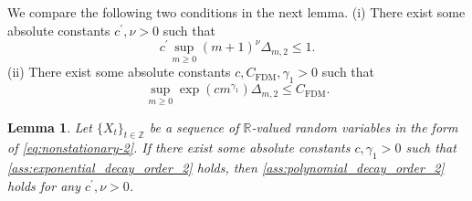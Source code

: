 \documentclass[11pt]{article}
\theoremstyle{plain}
\newtheorem{lemma}[theorem]{Lemma}
\theoremstyle{definition}
\begin{document}
We compare the following two conditions in the next lemma. (i) There exist some absolute constants $c^{\prime}, \nu > 0$ such that
    \begin{equation}\label{ass:polynomial_decay_order_2}
        c^{\prime}\sup_{m \geq 0}(m+1)^{\nu}\Delta_{m,2} \leq 1.
    \end{equation}
    (ii) There exist some absolute constants $c,  C_{\mathrm{FDM}}, \gamma_1 > 0$ such that
    \begin{equation}\label{ass:exponential_decay_order_2}
        \sup_{m \geq 0}\exp(cm^{\gamma_1})\Delta_{m,2} \leq C_{\mathrm{FDM}}.
    \end{equation}
    
\begin{lemma}
    Let $\{X_t\}_{t \in \mathbb{Z}}$ be a sequence of $\mathbb{R}$-valued random variables in the form of \eqref{eq:nonstationary-2}. If there exist some absolute constants $c, \gamma_1 > 0$ such that \eqref{ass:exponential_decay_order_2} holds, then \eqref{ass:polynomial_decay_order_2} holds for any $c^{\prime}, \nu > 0$.
\end{lemma}
\end{document}
